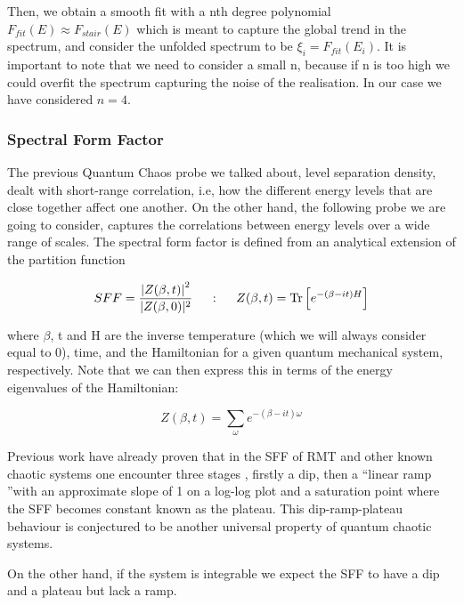 \documentclass[11pt,a4paper]{article}
\begin{document}
Then, we obtain a smooth fit with a nth degree polynomial $F_{fit}(E)\approx F_{stair}(E)$ which is meant to capture the global trend in the spectrum, and consider the unfolded spectrum to be $\xi_i = F_{fit}(E_i)$. It is important to note that we need to consider a small n, because if n is too high we could overfit the spectrum capturing the noise of the realisation. In our case we have considered $n=4$.

\subsubsection{Spectral Form Factor}

The previous Quantum Chaos probe we talked about, level separation density, dealt with short-range correlation, i.e, how the different energy levels that are close together affect one another. On the other hand, the following probe we are going to consider, captures the correlations between energy levels over a wide range of scales. The spectral form factor is defined from an analytical extension of the partition function

\begin{equation}\LA{SFF}
    SFF = \frac{\left|Z(\beta,t)\right|^2}{|Z(\beta,0)|^2} ~~~~:~~~~ Z(\beta,t) = \text{Tr}\left[e^{-(\beta-it)H}\right]
\end{equation}

{\noindent where $\beta$, t and H are the inverse temperature (which we will always consider equal to 0), time, and the Hamiltonian for a given quantum mechanical system, respectively. Note that we can then express this in terms of the energy eigenvalues of the Hamiltonian:}

\begin{equation}
    Z(\beta,t) = \sum_\omega e^{-(\beta-it)\omega}
\end{equation}

Previous work \cite{cotler_black_2017,PhysRevE.55.4067,Martinez_Azcona_2025} have already proven that in the SFF of RMT and other known chaotic systems one encounter three stages , firstly a dip, then a \textquotedblleft linear ramp \textquotedblright with an approximate slope of 1 on a log-log plot and a saturation point where the SFF becomes constant known as the plateau. This dip-ramp-plateau behaviour is conjectured to be another universal property of quantum chaotic systems.

On the other hand, if the system is integrable we expect the SFF to have a dip and a plateau but lack a ramp.
\end{document}
